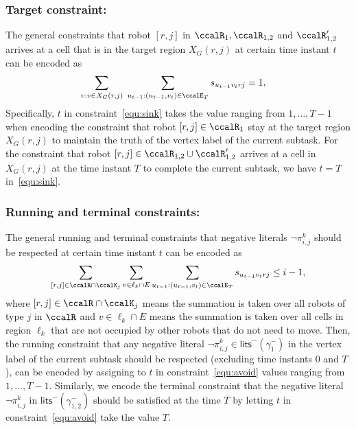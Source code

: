 \documentclass[Afour,sageh,times]{sagej}
\renewcommand{\ap}[3]{\mathcal{\pi}_{{#1},{#2}}^{#3}}
\begin{document}
{{\subsubsection{Target constraint:}
The general constraints that robot $[r,j]$ in $\ccalR_1, \ccalR_{1,2}$ and $\ccalR'_{1,2}$ arrives at a cell that is in the target region $X_G(r,j)$ at certain time instant $t$ can be encoded as
\begingroup\makeatletter\def\f@size{10}\check@mathfonts
\def\maketag@@@#1{\hbox{\m@th\normalsize\normalfont#1}}%
\begingroup
  \begin{align}\label{equ:sink}
  \sum_{v: v \in X_G(r,j) } \;\sum_{u_{t-1}:(u_{t-1}, v_{t}) \in \ccalE_T} s_{u_{t-1} v_{t} rj} &  = 1,
  \end{align}
  \endgroup
 Specifically, $t$ in constraint~\eqref{equ:sink} takes the value ranging from $1, \ldots, T-1$ when encoding the constraint that robot $[r,j] \in\ccalR_1$  stay at the target region $X_G(r,j)$ to maintain the truth of  the vertex label of the current subtask.  For the constraint that robot $[r,j]\in\ccalR_{1,2} \cup \ccalR'_{1,2}$ arrives at a cell in $X_G(r,j)$ at the time instant $T$ to complete the current subtask, we have $t = T$ in~\eqref{equ:sink}. %

 \subsubsection{Running and terminal constraints:} The general running and terminal constraints that negative literals $\neg \ap{i}{j}{k}$ should be respected at certain time instant $t$ can be encoded as
   \begingroup\makeatletter\def\f@size{10}\check@mathfonts
\def\maketag@@@#1{\hbox{\m@th\normalsize\normalfont#1}}%
\begin{align}\label{equ:avoid}
  \sum_{[r,j]\in \ccalR \cap \ccalK_j} \sum_{v \in \ell_k \cap E}   \sum_{u_{t-1}: (u_{t-1}, v_{t}) \in \ccalE_T} s_{u_{t-1} v_{t} r j } \leq i - 1,
\end{align}
\endgroup
where $[r,j] \in \ccalR \cap \ccalK_j$ means the summation is taken over all robots of type $j$ in $\ccalR$ and $v \in \ell_k \cap E$ means the summation is taken over all cells in region $\ell_k$ that are not occupied by other robots that do not need to move. Then, the running constraint that any
negative literal $\neg\ap{i}{j}{k} \in \mathsf{lits}^-(\gamma_1^-)$ in the vertex label of the current subtask should be respected (excluding time instants $0 $ and $T$), can be encoded by assigning to $t$ in constraint~\eqref{equ:avoid} values ranging from $1, \ldots, T-1$. Similarly, we encode the terminal constraint that the negative literal  $\neg\ap{i}{j}{k}$ in $\mathsf{lits}^-(\gamma_{1,2}^-)$  should be satisfied at the time $T$ by letting $t$ in constraint~\eqref{equ:avoid} take the value $T$.
}}
\end{document}
